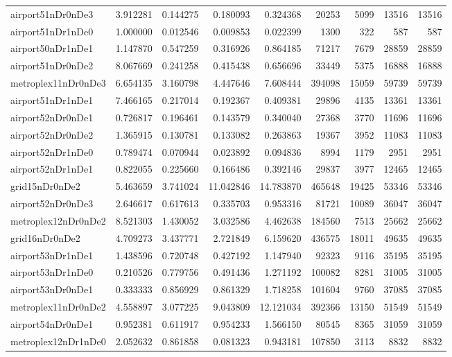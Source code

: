 \documentclass[../../../thesis.tex]{subfiles}
\begin{document}
\begin{longtable}{|l|r|r|r|r|r|r|r|r|}
airport51nDr0nDe3 & 3.912281 & 0.144275 & 0.180093 & 0.324368 & 20253 & 5099 & 13516 & 13516 \\
airport51nDr1nDe0 & 1.000000 & 0.012546 & 0.009853 & 0.022399 & 1300 & 322 & 587 & 587 \\
airport50nDr1nDe1 & 1.147870 & 0.547259 & 0.316926 & 0.864185 & 71217 & 7679 & 28859 & 28859 \\
airport51nDr0nDe2 & 8.067669 & 0.241258 & 0.415438 & 0.656696 & 33449 & 5375 & 16888 & 16888 \\
metroplex11nDr0nDe3 & 6.654135 & 3.160798 & 4.447646 & 7.608444 & 394098 & 15059 & 59739 & 59739 \\
airport51nDr1nDe1 & 7.466165 & 0.217014 & 0.192367 & 0.409381 & 29896 & 4135 & 13361 & 13361 \\
airport52nDr0nDe1 & 0.726817 & 0.196461 & 0.143579 & 0.340040 & 27368 & 3770 & 11696 & 11696 \\
airport52nDr0nDe2 & 1.365915 & 0.130781 & 0.133082 & 0.263863 & 19367 & 3952 & 11083 & 11083 \\
airport52nDr1nDe0 & 0.789474 & 0.070944 & 0.023892 & 0.094836 & 8994 & 1179 & 2951 & 2951 \\
airport52nDr1nDe1 & 0.822055 & 0.225660 & 0.166486 & 0.392146 & 29837 & 3977 & 12465 & 12465 \\
grid15nDr0nDe2 & 5.463659 & 3.741024 & 11.042846 & 14.783870 & 465648 & 19425 & 53346 & 53346 \\
airport52nDr0nDe3 & 2.646617 & 0.617613 & 0.335703 & 0.953316 & 81721 & 10089 & 36047 & 36047 \\
metroplex12nDr0nDe2 & 8.521303 & 1.430052 & 3.032586 & 4.462638 & 184560 & 7513 & 25662 & 25662 \\
grid16nDr0nDe2 & 4.709273 & 3.437771 & 2.721849 & 6.159620 & 436575 & 18011 & 49635 & 49635 \\
airport53nDr1nDe1 & 1.438596 & 0.720748 & 0.427192 & 1.147940 & 92323 & 9116 & 35195 & 35195 \\
airport53nDr1nDe0 & 0.210526 & 0.779756 & 0.491436 & 1.271192 & 100082 & 8281 & 31005 & 31005 \\
airport53nDr0nDe1 & 0.333333 & 0.856929 & 0.861329 & 1.718258 & 101604 & 9760 & 37085 & 37085 \\
metroplex11nDr0nDe2 & 4.558897 & 3.077225 & 9.043809 & 12.121034 & 392366 & 13150 & 51549 & 51549 \\
airport54nDr0nDe1 & 0.952381 & 0.611917 & 0.954233 & 1.566150 & 80545 & 8365 & 31059 & 31059 \\
metroplex12nDr1nDe0 & 2.052632 & 0.861858 & 0.081323 & 0.943181 & 107850 & 3113 & 8832 & 8832 \\

\end{longtable}
\end{document}
